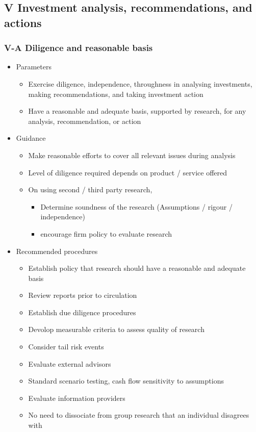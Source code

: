 \documentclass[../notes_compiled.tex]{subfiles}
\begin{document}
\subsection{V Investment analysis, recommendations, and actions}
\subsubsection{V-A Diligence and reasonable basis}
\begin{itemize}
\item Parameters
\begin{itemize}
\item Exercise diligence, independence, throughness in analysing investments, making recommendations, and taking investment action
\item Have a reasonable and adequate basis, supported by research, for any analysis, recommendation, or action
\end{itemize}
\item Guidance
\begin{itemize}
\item Make reasonable efforts to cover all relevant issues during analysis
\item Level of diligence required depends on product / service offered
\item On using second / third party research,
\begin{itemize}
\item Determine soundness of the research (Assumptions / rigour / independence)
\item encourage firm policy to evaluate research
\end{itemize}
\end{itemize}
\item Recommended procedures
\begin{itemize}
\item Establish policy that research should have a reasonable and adequate basis
\item Review reports prior to circulation
\item Establish due diligence procedures
\item Devolop measurable criteria to assess quality of research
\item Consider tail risk events
\item Evaluate external advisors
\item Standard scenario testing, cash flow sensitivity to assumptions
\item Evaluate information providers
\item No need to dissociate from group research that an individual disagrees with
\end{itemize}
\end{itemize}
\end{document}
